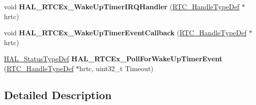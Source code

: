 \begin{DoxyCompactItemize}
\item 
\mbox{\label{group___r_t_c_ex___exported___functions___group2_ga5e391424483012fe09827739dc53885f}} 
void {\bfseries H\+A\+L\+\_\+\+R\+T\+C\+Ex\+\_\+\+Wake\+Up\+Timer\+I\+R\+Q\+Handler} (\hyperlink{struct_r_t_c___handle_type_def}{R\+T\+C\+\_\+\+Handle\+Type\+Def} $\ast$hrtc)
\item 
\mbox{\label{group___r_t_c_ex___exported___functions___group2_gac9ed5d6224b5c86f2845a9c1af7d94de}} 
void {\bfseries H\+A\+L\+\_\+\+R\+T\+C\+Ex\+\_\+\+Wake\+Up\+Timer\+Event\+Callback} (\hyperlink{struct_r_t_c___handle_type_def}{R\+T\+C\+\_\+\+Handle\+Type\+Def} $\ast$hrtc)
\item 
\mbox{\label{group___r_t_c_ex___exported___functions___group2_ga13cdc56c03d2d606ef8c635dcc25f555}} 
\hyperlink{stm32f4xx__hal__def_8h_a63c0679d1cb8b8c684fbb0632743478f}{H\+A\+L\+\_\+\+Status\+Type\+Def} {\bfseries H\+A\+L\+\_\+\+R\+T\+C\+Ex\+\_\+\+Poll\+For\+Wake\+Up\+Timer\+Event} (\hyperlink{struct_r_t_c___handle_type_def}{R\+T\+C\+\_\+\+Handle\+Type\+Def} $\ast$hrtc, uint32\+\_\+t Timeout)
\end{DoxyCompactItemize}


\subsection{Detailed Description}
